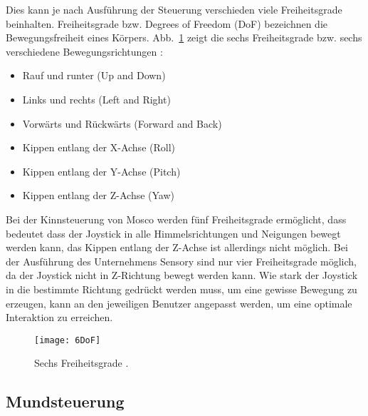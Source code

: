 \newline
Dies kann je nach Ausführung der Steuerung verschieden viele Freiheitsgrade beinhalten. Freiheitsgrade bzw. Degrees of Freedom (DoF) bezeichnen die Bewegungsfreiheit eines Körpers.
\newline
Abb.~\ref{fig:6DoF} zeigt die sechs Freiheitsgrade bzw. sechs verschiedene Bewegungsrichtungen \cite{6DoF}:
\begin{itemize}
      \item Rauf und runter (Up and Down)
      \item Links und rechts (Left and Right)
			\item Vorwärts und Rückwärts (Forward and Back)
			\item Kippen entlang der X-Achse (Roll)
      \item Kippen entlang der Y-Achse (Pitch)
			\item Kippen entlang der Z-Achse (Yaw)
\end{itemize}
%
\vspace{\baselineskip}
Bei der Kinnsteuerung von Mosco werden fünf Freiheitsgrade ermöglicht, dass bedeutet dass der Joystick in alle Himmelsrichtungen und Neigungen bewegt werden kann, das Kippen entlang der Z-Achse ist allerdings nicht möglich. Bei der Ausführung des Unternehmens Sensory sind nur vier Freiheitsgrade möglich, da der Joystick nicht in Z-Richtung bewegt werden kann. 
Wie stark der Joystick in die bestimmte Richtung gedrückt werden muss, um eine gewisse Bewegung zu erzeugen, kann an den jeweiligen Benutzer angepasst werden, um eine optimale Interaktion zu erreichen.
%
\begin{figure}
\centering
\texttt{[image: 6DoF]}
\caption{Sechs Freiheitsgrade \cite{6DoFPic}.}
\label{fig:6DoF}
\end{figure}
%
%

\subsection{Mundsteuerung}

